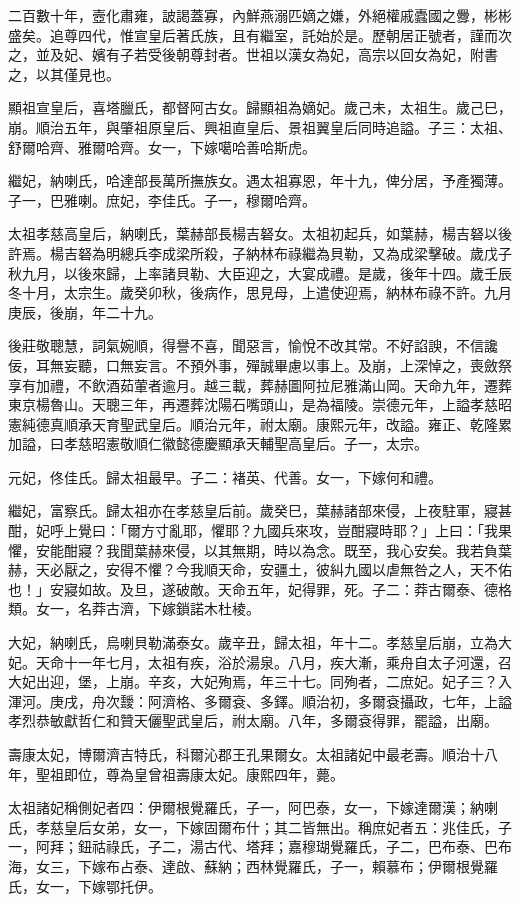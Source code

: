 \begin{pinyinscope}
二百數十年，壼化肅雍，詖謁蓋寡，內鮮燕溺匹嫡之嫌，外絕權戚蠹國之釁，彬彬盛矣。追尊四代，惟宣皇后著氏族，且有繼室，託始於是。歷朝居正號者，謹而次之，並及妃、嬪有子若受後朝尊封者。世祖以漢女為妃，高宗以回女為妃，附書之，以其僅見也。

顯祖宣皇后，喜塔臘氏，都督阿古女。歸顯祖為嫡妃。歲己未，太祖生。歲己巳，崩。順治五年，與肇祖原皇后、興祖直皇后、景祖翼皇后同時追謚。子三：太祖、舒爾哈齊、雅爾哈齊。女一，下嫁噶哈善哈斯虎。

繼妃，納喇氏，哈達部長萬所撫族女。遇太祖寡恩，年十九，俾分居，予產獨薄。子一，巴雅喇。庶妃，李佳氏。子一，穆爾哈齊。

太祖孝慈高皇后，納喇氏，葉赫部長楊吉砮女。太祖初起兵，如葉赫，楊吉砮以後許焉。楊吉砮為明總兵李成梁所殺，子納林布祿繼為貝勒，又為成梁擊破。歲戊子秋九月，以後來歸，上率諸貝勒、大臣迎之，大宴成禮。是歲，後年十四。歲壬辰冬十月，太宗生。歲癸卯秋，後病作，思見母，上遣使迎焉，納林布祿不許。九月庚辰，後崩，年二十九。

後莊敬聰慧，詞氣婉順，得譽不喜，聞惡言，愉悅不改其常。不好諂諛，不信讒佞，耳無妄聽，口無妄言。不預外事，殫誠畢慮以事上。及崩，上深悼之，喪斂祭享有加禮，不飲酒茹葷者逾月。越三載，葬赫圖阿拉尼雅滿山岡。天命九年，遷葬東京楊魯山。天聰三年，再遷葬沈陽石嘴頭山，是為福陵。崇德元年，上謚孝慈昭憲純德真順承天育聖武皇后。順治元年，祔太廟。康熙元年，改謚。雍正、乾隆累加謚，曰孝慈昭憲敬順仁徽懿德慶顯承天輔聖高皇后。子一，太宗。

元妃，佟佳氏。歸太祖最早。子二：褚英、代善。女一，下嫁何和禮。

繼妃，富察氏。歸太祖亦在孝慈皇后前。歲癸巳，葉赫諸部來侵，上夜駐軍，寢甚酣，妃呼上覺曰：「爾方寸亂耶，懼耶？九國兵來攻，豈酣寢時耶？」上曰：「我果懼，安能酣寢？我聞葉赫來侵，以其無期，時以為念。既至，我心安矣。我若負葉赫，天必厭之，安得不懼？今我順天命，安疆土，彼糾九國以虐無咎之人，天不佑也！」安寢如故。及旦，遂破敵。天命五年，妃得罪，死。子二：莽古爾泰、德格類。女一，名莽古濟，下嫁鎖諾木杜棱。

大妃，納喇氏，烏喇貝勒滿泰女。歲辛丑，歸太祖，年十二。孝慈皇后崩，立為大妃。天命十一年七月，太祖有疾，浴於湯泉。八月，疾大漸，乘舟自太子河還，召大妃出迎，堡，上崩。辛亥，大妃殉焉，年三十七。同殉者，二庶妃。妃子三？入渾河。庚戌，舟次靉：阿濟格、多爾袞、多鐸。順治初，多爾袞攝政，七年，上謚孝烈恭敏獻哲仁和贊天儷聖武皇后，祔太廟。八年，多爾袞得罪，罷謚，出廟。

壽康太妃，博爾濟吉特氏，科爾沁郡王孔果爾女。太祖諸妃中最老壽。順治十八年，聖祖即位，尊為皇曾祖壽康太妃。康熙四年，薨。

太祖諸妃稱側妃者四：伊爾根覺羅氏，子一，阿巴泰，女一，下嫁達爾漢；納喇氏，孝慈皇后女弟，女一，下嫁固爾布什；其二皆無出。稱庶妃者五：兆佳氏，子一，阿拜；鈕祜祿氏，子二，湯古代、塔拜；嘉穆瑚覺羅氏，子二，巴布泰、巴布海，女三，下嫁布占泰、達啟、蘇納；西林覺羅氏，子一，賴慕布；伊爾根覺羅氏，女一，下嫁鄂托伊。


\end{pinyinscope}
